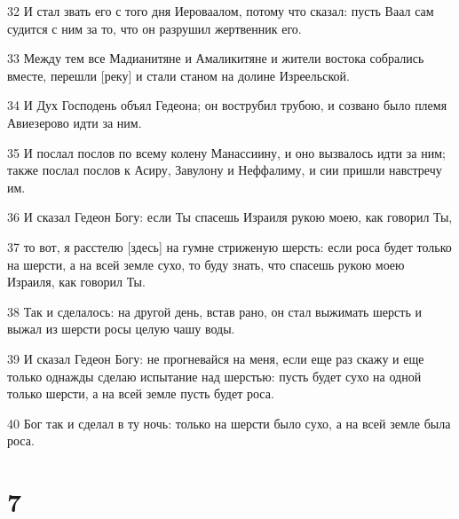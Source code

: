 \par 32 И стал звать его с того дня Иероваалом, потому что сказал: пусть Ваал сам судится с ним за то, что он разрушил жертвенник его.
\par 33 Между тем все Мадианитяне и Амаликитяне и жители востока собрались вместе, перешли [реку] и стали станом на долине Изреельской.
\par 34 И Дух Господень объял Гедеона; он вострубил трубою, и созвано было племя Авиезерово идти за ним.
\par 35 И послал послов по всему колену Манассиину, и оно вызвалось идти за ним; также послал послов к Асиру, Завулону и Неффалиму, и сии пришли навстречу им.
\par 36 И сказал Гедеон Богу: если Ты спасешь Израиля рукою моею, как говорил Ты,
\par 37 то вот, я расстелю [здесь] на гумне стриженую шерсть: если роса будет только на шерсти, а на всей земле сухо, то буду знать, что спасешь рукою моею Израиля, как говорил Ты.
\par 38 Так и сделалось: на другой день, встав рано, он стал выжимать шерсть и выжал из шерсти росы целую чашу воды.
\par 39 И сказал Гедеон Богу: не прогневайся на меня, если еще раз скажу и еще только однажды сделаю испытание над шерстью: пусть будет сухо на одной только шерсти, а на всей земле пусть будет роса.
\par 40 Бог так и сделал в ту ночь: только на шерсти было сухо, а на всей земле была роса.

\chapter{7}

